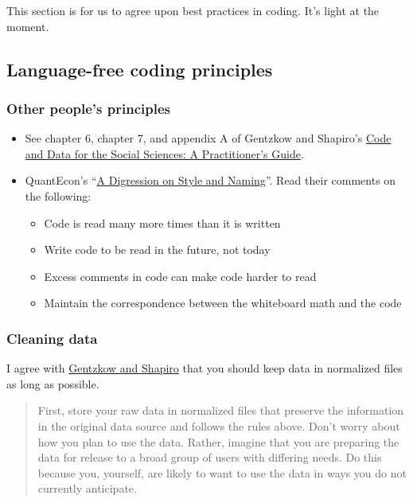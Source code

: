 This section is for us to agree upon best practices in coding.
It's light at the moment.

\subsection{Language-free coding principles}

\subsubsection{Other people's principles}

\begin{itemize}
	\item See chapter 6, chapter 7, and appendix A of Gentzkow and Shapiro's \href{https://web.stanford.edu/~gentzkow/research/CodeAndData.pdf}{Code and Data for the Social Sciences: A Practitioner’s Guide}.
	\item QuantEcon's ``\href{https://julia.quantecon.org/getting_started_julia/introduction_to_types.html#A-Digression-on-Style-and-Naming}{A Digression on Style and Naming}''. Read their comments on the following:
	\begin{itemize}
	\item Code is read many more times than it is written
	\item Write code to be read in the future, not today
	\item Excess comments in code can make code harder to read
	\item Maintain the correspondence between the whiteboard math and the code
	\end{itemize}
\end{itemize}

\subsubsection{Cleaning data}

I agree with \href{https://web.stanford.edu/~gentzkow/research/CodeAndData.xhtml}{Gentzkow and Shapiro}
that you should keep data in normalized files as long as possible.
\begin{quote}
First, store your raw data in normalized files that preserve the information in the original data source and follows the rules above.
Don't worry about how you plan to use the data.
Rather, imagine that you are preparing the data for release to a broad group of users with differing needs.
Do this because you, yourself, are likely to want to use the data in ways you do not currently anticipate.
\end{quote}

